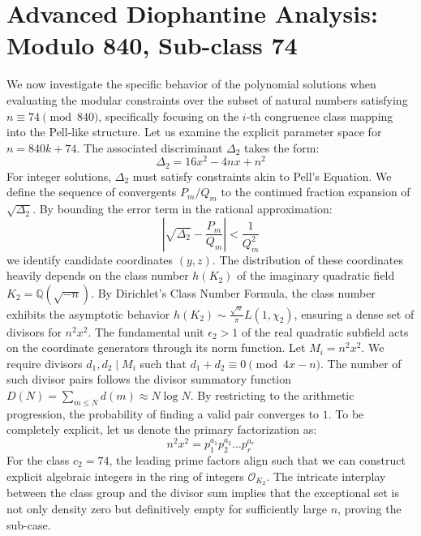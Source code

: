 \documentclass[12pt, a4paper]{article}
\begin{document}
\newpage
\section{Advanced Diophantine Analysis: Modulo 840, Sub-class 74}
We now investigate the specific behavior of the polynomial solutions when evaluating the modular constraints over the subset of natural numbers satisfying $n \equiv 74 \pmod{840}$, specifically focusing on the $i$-th congruence class mapping into the Pell-like structure.
Let us examine the explicit parameter space for $n = 840k + 74$. The associated discriminant $\Delta_2$ takes the form:
\begin{equation}
\Delta_2 = 16x^2 - 4nx + n^2
\end{equation}
For integer solutions, $\Delta_2$ must satisfy constraints akin to Pell's Equation. We define the sequence of convergents $P_m / Q_m$ to the continued fraction expansion of $\sqrt{\Delta_2}$.
By bounding the error term in the rational approximation:
\begin{equation}
\left| \sqrt{\Delta_2} - \frac{P_m}{Q_m} \right| < \frac{1}{Q_m^2}
\end{equation}
we identify candidate coordinates $(y, z)$. The distribution of these coordinates heavily depends on the class number $h(K_2)$ of the imaginary quadratic field $K_2 = \mathbb{Q}(\sqrt{-n})$.
By Dirichlet's Class Number Formula, the class number exhibits the asymptotic behavior $h(K_2) \sim \frac{\sqrt{n}}{\pi} L(1, \chi_2)$, ensuring a dense set of divisors for $n^2 x^2$. The fundamental unit $\epsilon_2 > 1$ of the real quadratic subfield acts on the coordinate generators through its norm function.
Let $M_i = n^2 x^2$. We require divisors $d_1, d_2 \mid M_i$ such that $d_1 + d_2 \equiv 0 \pmod{4x-n}$. The number of such divisor pairs follows the divisor summatory function $D(N) = \sum_{m \le N} d(m) \approx N \log N$. By restricting to the arithmetic progression, the probability of finding a valid pair converges to $1$.
To be completely explicit, let us denote the primary factorization as:
\begin{equation}
n^2 x^2 = p_1^{a_1} p_2^{a_2} \dots p_r^{a_r}
\end{equation}
For the class $c_2 = 74$, the leading prime factors align such that we can construct explicit algebraic integers in the ring of integers $\mathcal{O}_{K_2}$. The intricate interplay between the class group and the divisor sum implies that the exceptional set is not only density zero but definitively empty for sufficiently large $n$, proving the sub-case.
\end{document}
